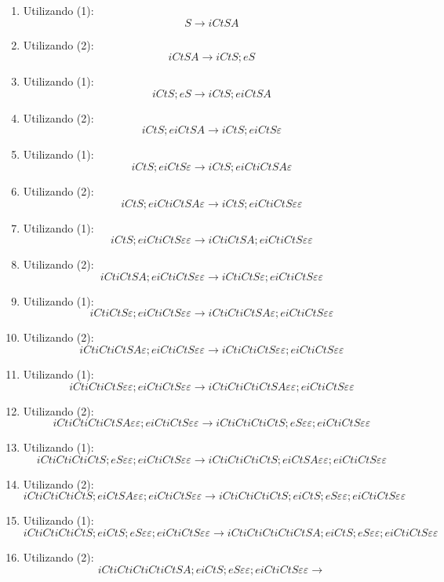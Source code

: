 \documentclass[11pt]{article}
\begin{document}
\begin{enumerate}

\item Utilizando (1): \[ S \rightarrow iCtSA \]
\item Utilizando (2): \[ iCtSA \rightarrow iCtS;eS \]
\item Utilizando (1): \[ iCtS;eS \rightarrow iCtS;eiCtSA \]
\item Utilizando (2): \[ iCtS;eiCtSA \rightarrow iCtS;eiCtS\varepsilon \]
\item Utilizando (1): \[ iCtS;eiCtS\varepsilon \rightarrow iCtS;eiCtiCtSA\varepsilon \]
\item Utilizando (2): \[ iCtS;eiCtiCtSA\varepsilon \rightarrow iCtS;eiCtiCtS\varepsilon\varepsilon \]
\item Utilizando (1): \[ iCtS;eiCtiCtS\varepsilon\varepsilon \rightarrow iCtiCtSA;eiCtiCtS\varepsilon\varepsilon \]
\item Utilizando (2): \[ iCtiCtSA;eiCtiCtS\varepsilon\varepsilon \rightarrow iCtiCtS\varepsilon;eiCtiCtS\varepsilon\varepsilon \]
\item Utilizando (1): \[ iCtiCtS\varepsilon;eiCtiCtS\varepsilon\varepsilon \rightarrow iCtiCtiCtSA\varepsilon;eiCtiCtS\varepsilon\varepsilon \]
\item Utilizando (2): \[ iCtiCtiCtSA\varepsilon;eiCtiCtS\varepsilon\varepsilon \rightarrow  iCtiCtiCtS\varepsilon\varepsilon;eiCtiCtS\varepsilon\varepsilon \]
\item Utilizando (1): \[ iCtiCtiCtS\varepsilon\varepsilon;eiCtiCtS\varepsilon\varepsilon \rightarrow iCtiCtiCtiCtSA\varepsilon\varepsilon;eiCtiCtS\varepsilon\varepsilon \]
\item Utilizando (2): \[ iCtiCtiCtiCtSA\varepsilon\varepsilon;eiCtiCtS\varepsilon\varepsilon \rightarrow iCtiCtiCtiCtS;eS\varepsilon\varepsilon;eiCtiCtS\varepsilon\varepsilon \]
\item Utilizando (1): \[ iCtiCtiCtiCtS;eS\varepsilon\varepsilon;eiCtiCtS\varepsilon\varepsilon \rightarrow iCtiCtiCtiCtS;eiCtSA\varepsilon\varepsilon;eiCtiCtS\varepsilon\varepsilon \]
\item Utilizando (2): \[ iCtiCtiCtiCtS;eiCtSA\varepsilon\varepsilon;eiCtiCtS\varepsilon\varepsilon \rightarrow iCtiCtiCtiCtS;eiCtS;eS\varepsilon\varepsilon;eiCtiCtS\varepsilon\varepsilon \]
\item Utilizando (1): \[ iCtiCtiCtiCtS;eiCtS;eS\varepsilon\varepsilon;eiCtiCtS\varepsilon\varepsilon \rightarrow iCtiCtiCtiCtiCtSA;eiCtS;eS\varepsilon\varepsilon;eiCtiCtS\varepsilon\varepsilon \]
\item Utilizando (2): \[ iCtiCtiCtiCtiCtSA;eiCtS;eS\varepsilon\varepsilon;eiCtiCtS\varepsilon\varepsilon \rightarrow 
\]
\end{enumerate}
\end{document}
